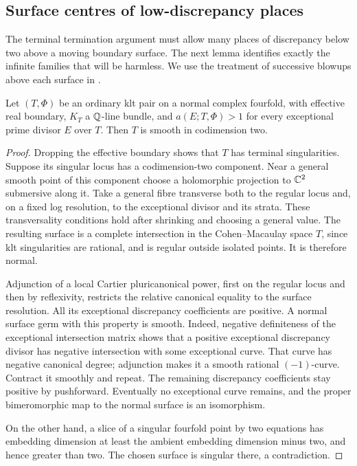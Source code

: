 \subsection{Surface centres of low-discrepancy places}

The terminal termination argument must allow many places of discrepancy
below two above a moving boundary surface.  The next lemma identifies
exactly the infinite families that will be harmless. We use the treatment
of successive blowups above each surface in
\cite[Proposition~3.1 and Lemma~3.2]{Fujino2005Addendum}.

\begin{lemma}\label{lem:terminal-codim-two}
Let $(T,\Phi)$ be an ordinary klt pair on a normal complex fourfold,
with effective real boundary, $K_T$ a $\mathbb Q$-line bundle, and
$a(E;T,\Phi)>1$ for every exceptional prime divisor $E$ over $T$.
Then $T$ is smooth in codimension two.
\end{lemma}

\begin{proof}
Dropping the effective boundary shows that $T$ has terminal
singularities.  Suppose its singular locus has a codimension-two
component.  Near a general smooth point of this component choose a
holomorphic projection to $\mathbb C^2$ submersive along it.  Take a general
fibre transverse both to the regular locus and, on a fixed log
resolution, to the exceptional divisor and its strata.  These
transversality conditions hold after shrinking and choosing a general
value.  The resulting surface is a complete intersection in the
Cohen--Macaulay space $T$, since klt singularities are rational, and is
regular outside isolated points.  It is therefore normal.

Adjunction of a local Cartier pluricanonical power, first on the regular
locus and then by reflexivity, restricts the relative canonical equality
to the surface resolution.  All its exceptional discrepancy coefficients
are positive.  A normal surface germ with this property is smooth.
Indeed, negative definiteness of the exceptional intersection matrix
shows that a positive exceptional discrepancy divisor has negative
intersection with some exceptional curve.  That curve has negative
canonical degree; adjunction makes it a smooth rational $(-1)$-curve.
Contract it smoothly and repeat.  The remaining discrepancy coefficients
stay positive by pushforward.  Eventually no exceptional curve remains,
and the proper bimeromorphic map to the normal surface is an isomorphism.

On the other hand, a slice of a singular fourfold point by two equations
has embedding dimension at least the ambient embedding dimension minus
two, and hence greater than two.  The chosen surface is singular there,
a contradiction.
\end{proof}

